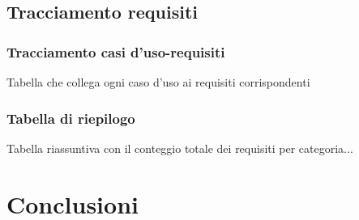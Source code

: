 \documentclass[11pt,a4paper]{article}
\begin{document}
\subsection{Tracciamento requisiti}
\subsubsection{Tracciamento casi d'uso-requisiti}
Tabella che collega ogni caso d'uso ai requisiti corrispondenti

\subsubsection{Tabella di riepilogo}
Tabella riassuntiva con il conteggio totale dei requisiti per categoria...

\newpage

\section{Conclusioni}
\end{document}
